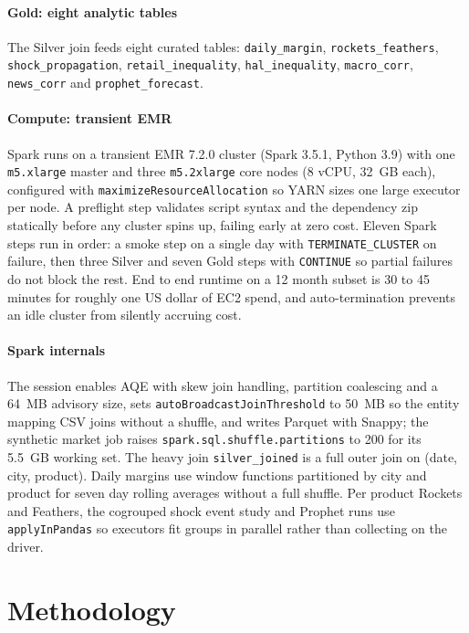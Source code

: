\documentclass[conference]{IEEEtran}
\begin{document}
\paragraph{Gold: eight analytic tables} The Silver join feeds eight curated tables: \texttt{daily\_margin}, \texttt{rockets\_feathers}, \texttt{shock\_propagation}, \texttt{retail\_inequality}, \texttt{hal\_inequality}, \texttt{macro\_corr}, \texttt{news\_corr} and \texttt{prophet\_forecast}.

\paragraph{Compute: transient EMR} Spark runs on a transient EMR 7.2.0 cluster (Spark 3.5.1, Python 3.9) with one \texttt{m5.xlarge} master and three \texttt{m5.2xlarge} core nodes (8 vCPU, 32~GB each), configured with \texttt{maximizeResourceAllocation} so YARN sizes one large executor per node. A preflight step validates script syntax and the dependency zip statically before any cluster spins up, failing early at zero cost. Eleven Spark steps run in order: a smoke step on a single day with \texttt{TERMINATE\_CLUSTER} on failure, then three Silver and seven Gold steps with \texttt{CONTINUE} so partial failures do not block the rest. End to end runtime on a 12 month subset is 30 to 45 minutes for roughly one US dollar of EC2 spend, and auto-termination prevents an idle cluster from silently accruing cost.

\paragraph{Spark internals} The session enables AQE with skew join handling, partition coalescing and a 64~MB advisory size, sets \texttt{autoBroadcastJoinThreshold} to 50~MB so the entity mapping CSV joins without a shuffle, and writes Parquet with Snappy; the synthetic market job raises \texttt{spark.sql.shuffle.partitions} to 200 for its 5.5~GB working set. The heavy join \texttt{silver\_joined} is a full outer join on (date, city, product). Daily margins use window functions partitioned by city and product for seven day rolling averages without a full shuffle. Per product Rockets and Feathers, the cogrouped shock event study and Prophet runs use \texttt{applyInPandas} so executors fit groups in parallel rather than collecting on the driver.

\section{Methodology}
\label{sec:method}
\end{document}

